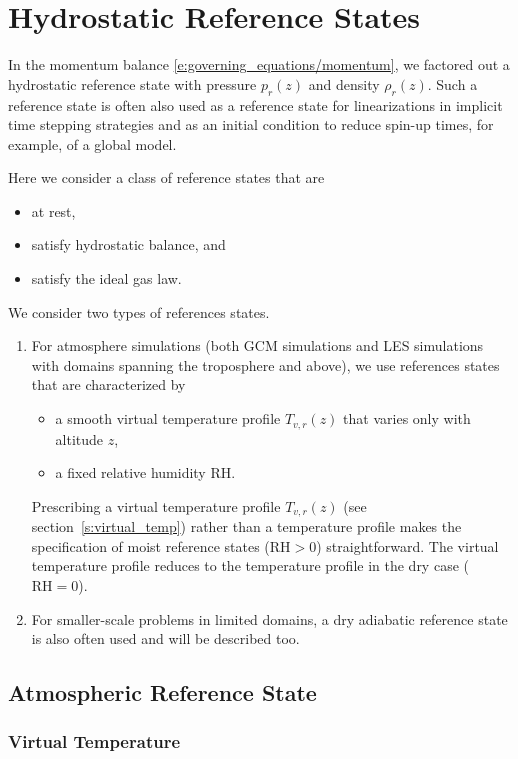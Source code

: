\documentclass{report}
\begin{document}
    
\chapter{Hydrostatic Reference States}\label{c:reference_state}

In the momentum balance \eqref{e:governing_equations/momentum}, we factored out a hydrostatic reference state with pressure $p_r(z)$ and density $\rho_r(z)$. Such a reference state is often also used as a reference state for linearizations in implicit time stepping strategies and as an initial condition to reduce spin-up times, for example, of a global model. 

Here we consider a class of reference states that are
\begin{itemize}
    \item at rest,
    \item satisfy hydrostatic balance, and
    \item satisfy the ideal gas law.
\end{itemize}

We consider two types of references states. 
\begin{enumerate}
    \item For atmosphere simulations (both GCM simulations and LES simulations with domains spanning the troposphere and above), we use references states that are characterized by
\begin{itemize}
    \item a smooth virtual temperature profile $T_{v,r}(z)$ that varies only with altitude $z$,
    \item a fixed relative humidity RH.
\end{itemize}
Prescribing a virtual temperature profile $T_{v,r}(z)$ (see section~\ref{s:virtual_temp}) rather than a temperature profile makes the specification of moist reference states ($\mathrm{RH}>0$)  straightforward. The virtual temperature profile reduces to the temperature profile in the dry case ($\mathrm{RH}=0$).
\item For smaller-scale problems in limited domains, a dry adiabatic reference state is also often used and will be described too.
\end{enumerate}

\section{Atmospheric Reference State}

\subsection{Virtual Temperature}
\end{document}
